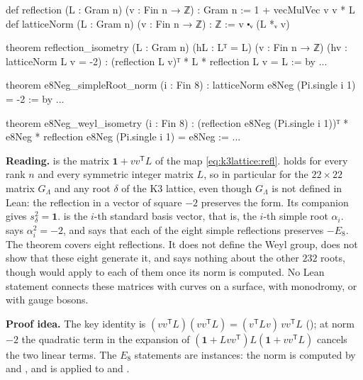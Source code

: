\begin{leanbox}
\begin{leancode}
def reflection (L : Gram n) (v : Fin n → ℤ) : Gram n :=
  1 + vecMulVec v v * L
def latticeNorm (L : Gram n) (v : Fin n → ℤ) : ℤ := v ⬝ᵥ (L *ᵥ v)

theorem reflection_isometry (L : Gram n) (hL : Lᵀ = L) (v : Fin n → ℤ)
    (hv : latticeNorm L v = -2) :
    (reflection L v)ᵀ * L * reflection L v = L := by ...

theorem e8Neg_simpleRoot_norm (i : Fin 8) :
    latticeNorm e8Neg (Pi.single i 1) = -2 := by ...

theorem e8Neg_weyl_isometry (i : Fin 8) :
    (reflection e8Neg (Pi.single i 1))ᵀ * e8Neg
      * reflection e8Neg (Pi.single i 1) = e8Neg := ...
\end{leancode}
\textbf{Reading.}  is the matrix $\mathbf1+vv^{\mathsf T}L$ of the map
\eqref{eq:k3lattice:refl}.  holds for every rank $n$ and every
symmetric integer matrix $L$, so in particular for the $22\times22$ matrix $G_\Lambda$ and
any root $\delta$ of the K3 lattice, even though $G_\Lambda$ is not defined in Lean: the
reflection in a vector of square $-2$ preserves the form. Its companion
 gives $s_\delta^2=\mathbf1$.  is the $i$-th
standard basis vector, that is, the $i$-th simple root $\alpha_i$.
 says $\alpha_i^2=-2$, and  says
that each of the eight simple reflections preserves $-E_8$. The theorem covers eight
reflections. It does not define the Weyl group, does not show that these eight generate it,
and says nothing about the other $232$ roots, though  would apply
to each of them once its norm is computed. No Lean statement connects these matrices with
curves on a surface, with monodromy, or with gauge bosons.

\textbf{Proof idea.} The key identity is $(vv^{\mathsf T}L)(vv^{\mathsf T}L)=
(v^{\mathsf T}Lv)\,vv^{\mathsf T}L$ (); at norm $-2$ the quadratic
term in the expansion of $(\mathbf1+Lvv^{\mathsf T})L(\mathbf1+vv^{\mathsf T}L)$ cancels the
two linear terms. The $E_8$ statements are instances: the norm is computed by
 and , and  is
 applied to  and .
\end{leanbox}

